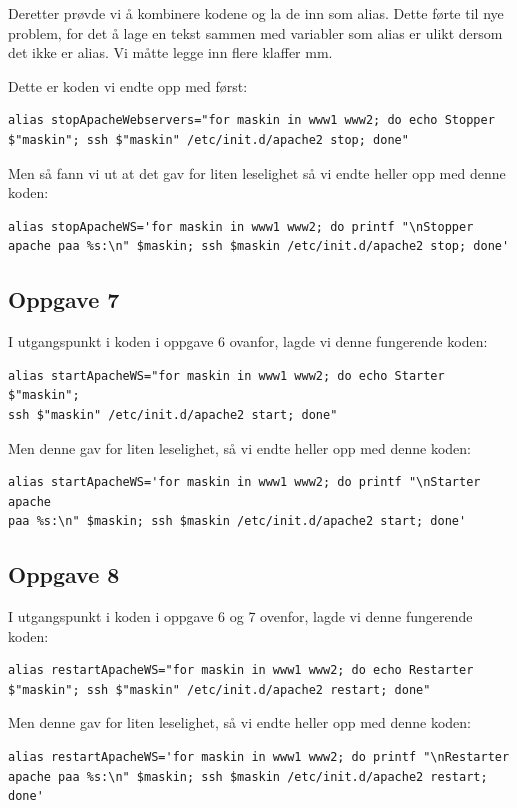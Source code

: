 \documentclass[a4paper, norsk, 12pt]{article}
\begin{document}
Deretter prøvde vi å kombinere kodene og la de inn som alias. Dette førte til nye problem, for det å lage en tekst sammen med variabler som alias er ulikt dersom det ikke er alias. Vi måtte legge inn flere klaffer mm.

Dette er koden vi endte opp med først:
\begin{verbatim}
alias stopApacheWebservers="for maskin in www1 www2; do echo Stopper 
$"maskin"; ssh $"maskin" /etc/init.d/apache2 stop; done"
\end{verbatim}

Men så fann vi ut at det gav for liten leselighet så vi endte heller opp med denne koden:
\begin{verbatim}
alias stopApacheWS='for maskin in www1 www2; do printf "\nStopper 
apache paa %s:\n" $maskin; ssh $maskin /etc/init.d/apache2 stop; done'
\end{verbatim}

\subsection{Oppgave 7}
I utgangspunkt i koden i oppgave 6 ovanfor, lagde vi denne fungerende koden:
\begin{verbatim}
alias startApacheWS="for maskin in www1 www2; do echo Starter $"maskin"; 
ssh $"maskin" /etc/init.d/apache2 start; done"
\end{verbatim}

Men denne gav for liten leselighet, så vi endte heller opp med denne koden:
\begin{verbatim}
alias startApacheWS='for maskin in www1 www2; do printf "\nStarter apache 
paa %s:\n" $maskin; ssh $maskin /etc/init.d/apache2 start; done'
\end{verbatim}

\subsection{Oppgave 8}
I utgangspunkt i koden i oppgave 6 og 7 ovenfor, lagde vi denne fungerende koden:
\begin{verbatim}
alias restartApacheWS="for maskin in www1 www2; do echo Restarter 
$"maskin"; ssh $"maskin" /etc/init.d/apache2 restart; done"
\end{verbatim}

Men denne gav for liten leselighet, så vi endte heller opp med denne koden:
\begin{verbatim}
alias restartApacheWS='for maskin in www1 www2; do printf "\nRestarter 
apache paa %s:\n" $maskin; ssh $maskin /etc/init.d/apache2 restart; done'
\end{verbatim}
\end{document}

